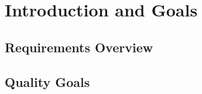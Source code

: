 \section{Introduction and Goals}


\subsection{Requirements Overview}






\subsection{Quality Goals}

